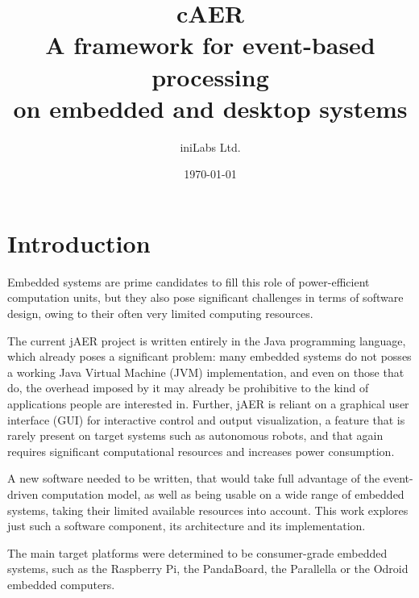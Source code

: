 \documentclass[a4paper,12pt]{report}
\begin{document}
\title{\textbf{cAER}\\A framework for event-based processing\\on embedded and desktop systems}

\author{iniLabs Ltd.}

\date{\today}

\maketitle

\tableofcontents{}

\chapter{Introduction} \label{chap:introduction}

Embedded systems are prime candidates to fill this role of power-efficient computation units, but they also pose significant challenges in terms of software design, owing to their often very limited computing resources.

The current jAER project is written entirely in the Java programming language, which already poses a significant problem: many embedded systems do not posses a working Java Virtual Machine (JVM) implementation, and even on those that do, the overhead imposed by it may already be prohibitive to the kind of applications people are interested in. Further, jAER is reliant on a graphical user interface (GUI) for interactive control and output visualization, a feature that is rarely present on target systems such as autonomous robots, and that again requires significant computational resources and increases power consumption.

A new software needed to be written, that would take full advantage of the event-driven computation model, as well as being usable on a wide range of embedded systems, taking their limited available resources into account.
This work explores just such a software component, its architecture and its implementation.

The main target platforms were determined to be consumer-grade embedded systems, such as the Raspberry Pi, the PandaBoard, the Parallella or the Odroid embedded computers.
\end{document}
